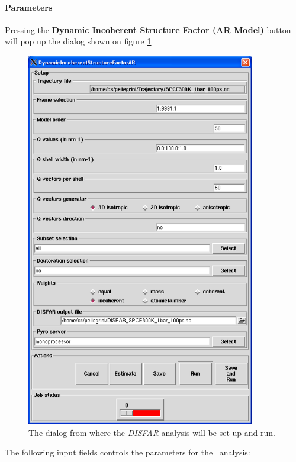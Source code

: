 \documentclass[a4paper,11pt]{report}
\begin{document}
\paragraph{Parameters\\}
\label{disfar_parameters}
Pressing the \textbf{Dynamic Incoherent Structure Factor (AR Model)} button will pop up the dialog shown on figure 
\ref{fig:disfar}
\begin{figure}[h!]
\begin{center}
\includegraphics[width=10cm]{Figures/disfar.eps}
\end{center}
\caption[The \textit{DISFAR} analysis dialog]{The dialog from where the \textit{DISFAR} analysis will be set up and run.}
\label{fig:disfar}
\end{figure}   

The following input fields controls the parameters for the \DISFAR\ analysis:
\end{document}

